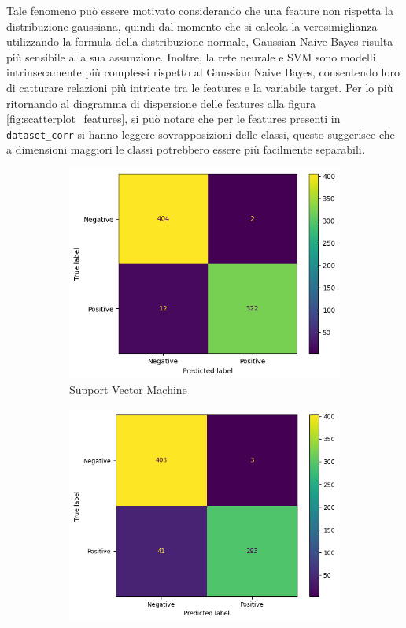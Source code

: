 Tale fenomeno può essere motivato considerando che una feature non rispetta
la distribuzione gaussiana, quindi dal momento che si calcola la verosimiglianza
utilizzando la formula della distribuzione normale, Gaussian Naive Bayes risulta
più sensibile alla sua assunzione. Inoltre, la rete neurale e SVM sono modelli
intrinsecamente più complessi rispetto al Gaussian Naive Bayes, consentendo loro
di catturare relazioni più intricate tra le features e la variabile target. Per
lo più ritornando al diagramma di dispersione delle features alla figura
\ref{fig:scatterplot_features}, si può notare che per le features presenti in
\texttt{dataset\_corr} si hanno leggere sovrapposizioni delle classi, questo
suggerisce che a dimensioni maggiori le classi potrebbero essere più facilmente
separabili.
\begin{figure}[!ht]
    \centering
    \begin{subfigure}{0.45\textwidth}
        \centering
        \includegraphics[width=\textwidth]{img/svm/matrice_confusione_corr.png}
        \caption{Support Vector Machine}
        \label{fig:matrice_di_confusione_per_SVM_corr}
    \end{subfigure}
    \hfill
    \begin{subfigure}{.45\textwidth}
        \centering
        \includegraphics[width=\textwidth]{img/gnb/confusion_matrix_corr.png}

\end{subfigure}
\end{figure}
